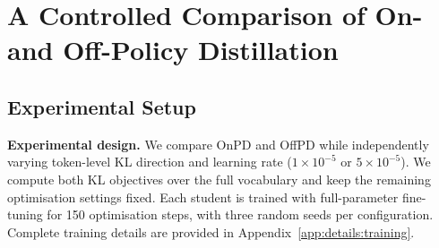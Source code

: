 \documentclass{article} %
\theoremstyle{plain}
\theoremstyle{definition}
\theoremstyle{remark}
\begin{document}





\section{A Controlled Comparison of On- and Off-Policy Distillation}
\label{sec:on_vs_offpd}
\subsection{Experimental Setup}

\textbf{Experimental design.}
We compare OnPD and OffPD while independently varying token-level KL direction and learning rate ($1\times10^{-5}$ or $5 \times 10^{-5}$). We compute both KL objectives over the full vocabulary and keep the remaining optimisation settings fixed. Each student is trained with full-parameter fine-tuning for 150 optimisation steps, with three random seeds per configuration. Complete training details are provided in Appendix~\ref{app:details:training}.

\end{document}
